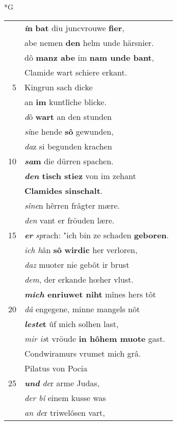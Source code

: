\documentclass[8pt,a4paper,notitlepage]{article}
\begin{document}
\begin{table}[ht]
\begin{minipage}[t]{0.5\linewidth}
\small
\begin{center}*G
\end{center}
\begin{tabular}{rl}
 & \textbf{\textit{i}n} \textbf{bat} diu juncvrouwe \textbf{fier},\\ 
 & abe nemen \textbf{den} helm unde härsnier.\\ 
 & dô \textbf{manz abe} im \textbf{nam unde bant},\\ 
 & Clamide wart schiere erkant.\\ 
5 & Kingrun sach dicke\\ 
 & an \textbf{im} kuntlîche blicke.\\ 
 & \textit{d}ô \textbf{wart} an den stunden\\ 
 & \textit{sî}ne hende \textbf{sô} gewunden,\\ 
 & \textit{da}z si begunden krachen\\ 
10 & \textbf{\textit{sa}m} die dürren spachen.\\ 
 & \textbf{\textit{den} tisch stiez} von im zehant\\ 
 & \textbf{Clamides sinschalt}.\\ 
 & \textit{sîne}n hêrren frâgter mære.\\ 
 & \textit{den} vant er fröuden lære.\\ 
15 & \textit{\textbf{er}} \textit{sp}rach: "ich bin ze schaden \textbf{geboren}.\\ 
 & \textit{ich h}ân \textbf{sô} \textbf{wirdic} her verloren,\\ 
 & \textit{daz} muoter nie gebôt ir brust\\ 
 & \textit{dem}, der erkande hœher vlust.\\ 
 & \textbf{\textit{mich} enriuwet niht} mînes hers tôt\\ 
20 & \textit{dâ} engegene, minne mangels nôt\\ 
 & \textbf{\textit{leste}t} ûf mich solhen last,\\ 
 & \textit{mir is}t vröude \textbf{in hôhem muote} gast.\\ 
 & Condwiramurs vrumet mich grâ.\\ 
 & Pilatus von Pocia\\ 
25 & \textit{\textbf{und}} \textit{de}r arme Judas,\\ 
 & \textit{der bî} einem kusse was\\ 
 & \textit{an de}r triwelôsen vart,\\ 

\end{tabular}
\end{minipage}
\end{table}
\end{document}
